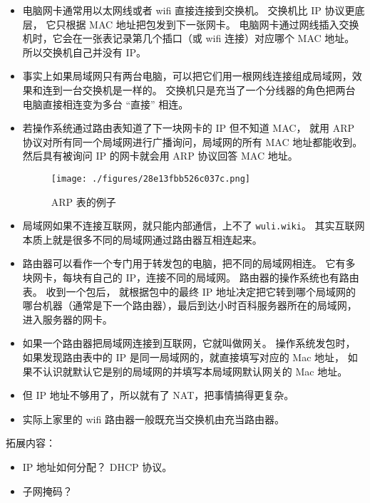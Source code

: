 \begin{itemize}
\item 电脑网卡通常用以太网线或者 wifi 直接连接到交换机。 交换机比 IP 协议更底层， 它只根据 MAC 地址把包发到下一张网卡。 电脑网卡通过网线插入交换机时，它会在一张表记录第几个插口（或 wifi 连接）对应哪个 MAC 地址。 所以交换机自己并没有 IP。
\item 事实上如果局域网只有两台电脑，可以把它们用一根网线连接组成局域网，效果和连到一台交换机是一样的。 交换机只是充当了一个分线器的角色把两台电脑直接相连变为多台 “直接” 相连。
\item 若操作系统通过路由表知道了下一块网卡的 IP 但不知道 MAC， 就用 ARP 协议对所有同一个局域网进行广播询问，局域网的所有 MAC 地址都能收到。 然后具有被询问 IP 的网卡就会用 ARP 协议回答 MAC 地址。
\begin{figure}[ht]
\centering
\texttt{[image: ./figures/28e13fbb526c037c.png]}
\caption{ARP 表的例子} \label{fig_NetNt_4}
\end{figure}
\item 局域网如果不连接互联网，就只能内部通信，上不了 \verb`wuli.wiki`。 其实互联网本质上就是很多不同的局域网通过路由器互相连起来。
\item 路由器可以看作一个专门用于转发包的电脑，把不同的局域网相连。 它有多块网卡，每块有自己的 IP，连接不同的局域网。 路由器的操作系统也有路由表。 收到一个包后， 就根据包中的最终 IP 地址决定把它转到哪个局域网的哪台机器（通常是下一个路由器），最后到达小时百科服务器所在的局域网， 进入服务器的网卡。
\item 如果一个路由器把局域网连接到互联网，它就叫做网关。 操作系统发包时，如果发现路由表中的 IP 是同一局域网的，就直接填写对应的 Mac 地址， 如果不认识就默认它是别的局域网的并填写本局域网默认网关的 Mac 地址。
\item 但 IP 地址不够用了，所以就有了 NAT，把事情搞得更复杂。
\item 实际上家里的 wifi 路由器一般既充当交换机由充当路由器。
\end{itemize}
拓展内容：
\begin{itemize}
\item IP 地址如何分配？ DHCP 协议。
\item 子网掩码？
\end{itemize}

